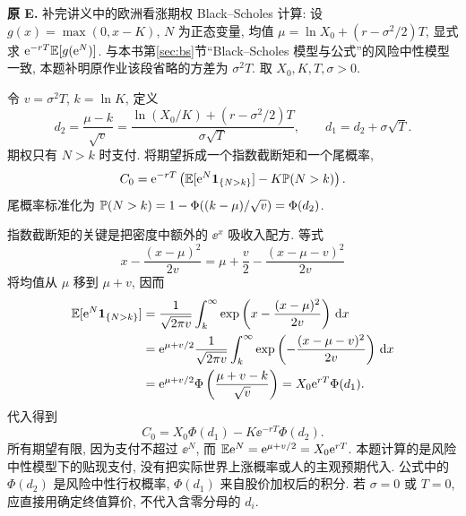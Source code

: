 \begin{exercise}\label{ex:P10.E}\label{part:P10.E}
\textbf{原 E.} 补完讲义中的欧洲看涨期权 Black--Scholes 计算: 设 $g(x)=\max(0,x-K)$, $N$ 为正态变量, 均值 $\mu=\ln X_0+(r-\sigma^2/2)T$, 显式求 $\mathrm e^{-rT}\mathbb E[g(\mathrm e^N)]$. 与本书第\ref{sec:bs}节“Black--Scholes 模型与公式”的风险中性模型一致, 本题补明原作业该段省略的方差为 $\sigma^2T$. 取 $X_0,K,T,\sigma>0$.
\end{exercise}
\begin{solution}\label{sol:P10.E}
令 $v=\sigma^2T$, $k=\ln K$, 定义
\[
 d_2=\frac{\mu-k}{\sqrt v}
 =\frac{\ln(X_0/K)+(r-\sigma^2/2)T}{\sigma\sqrt T},
 \qquad d_1=d_2+\sigma\sqrt T.
\]
期权只有 $N>k$ 时支付. 将期望拆成一个指数截断矩和一个尾概率,
\[
 C_0=\mathrm e^{-rT}\left(\mathbb E[\mathrm e^N\mathbf 1_{\{N>k\}}]-K\mathbb P(N>k)\right).
\]
尾概率标准化为 $\mathbb P(N>k)=1-\Phi((k-\mu)/\sqrt v)=\Phi(d_2)$.

指数截断矩的关键是把密度中额外的 $\ee^x$ 吸收入配方. 等式
\[
 x-\frac{(x-\mu)^2}{2v}
 =\mu+\frac v2-\frac{(x-\mu-v)^2}{2v}
\]
将均值从 $\mu$ 移到 $\mu+v$, 因而
\begin{align*}
 \mathbb E[\mathrm e^N\mathbf 1_{\{N>k\}}]
 &=\frac1{\sqrt{2\pi v}}\int_k^\infty
       \exp\left(x-\frac{(x-\mu)^2}{2v}\right)\,\mathrm d x\\
 &=\mathrm e^{\mu+v/2}\frac1{\sqrt{2\pi v}}\int_k^\infty
       \exp\left(-\frac{(x-\mu-v)^2}{2v}\right)\,\mathrm d x\\
 &=\mathrm e^{\mu+v/2}\Phi\left(\frac{\mu+v-k}{\sqrt v}\right)
 =X_0\mathrm e^{rT}\Phi(d_1).
\end{align*}
代入得到
\[
 C_0=X_0\Phi(d_1)-K\ee^{-rT}\Phi(d_2).
\]
所有期望有限, 因为支付不超过 $\ee^N$, 而 $\mathbb E\mathrm e^N=\mathrm e^{\mu+v/2}=X_0\mathrm e^{rT}$. 本题计算的是风险中性模型下的贴现支付, 没有把实际世界上涨概率或人的主观预期代入. 公式中的 $\Phi(d_2)$ 是风险中性行权概率, $\Phi(d_1)$ 来自股价加权后的积分. 若 $\sigma=0$ 或 $T=0$, 应直接用确定终值算价, 不代入含零分母的 $d_i$.
\end{solution}

